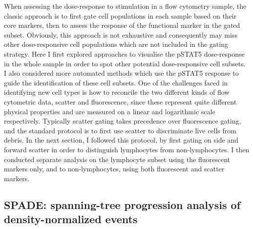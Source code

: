 When assessing the dose-response to stimulation in a flow cytometry sample, the classic approach is to first gate cell populations in each sample based on their core markers,
then to assess the response of the functional marker in the gated subset.
Obviously, this approach is not exhaustive and consequently may miss other dose-responsive cell populations which are not included in the gating strategy.
Here I first explored approaches to visualise the pSTAT5 dose-response in the whole sample in order to spot other potential dose-responsive cell subsets.
I also considered more automated methods which use the pSTAT5 response to guide the identification of these cell subsets.
One of the challenges faced in identifying new cell types is how to reconcile the two different kinds of flow cytometric data, scatter and fluorescence, since these represent quite different physical properties and are measured on a linear and logarithmic scale respectively.
Typically scatter gating takes precedence over fluorescence gating, and the standard protocol is to first use scatter to discriminate live cells from debris.
In the next section, I followed this protocol, by first gating on side and forward scatter in order to distinguish lymphocytes from non-lymphocytes.
I then conducted separate analysis on the lymphocyte subset using the fluorescent markers only, and to non-lymphocytes, using both fluorescent and scatter markers.


\subsection{SPADE: spanning-tree progression analysis of density-normalized events}

